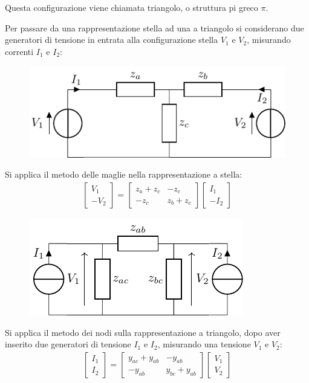 \documentclass{article}
\numberwithin{equation}{subsection}
\begin{document}
Questa configurazione viene chiamata triangolo, o struttura pi greco $\pi$.  

Per passare da una rappresentazione stella ad una a triangolo si considerano due generatori di tensione in entrata alla configurazione stella $V_1$ e $V_2$, misurando 
correnti $I_1$ e $I_2$:

\begin{figure}[ht]%
    \centering
    \includegraphics{rappresentazione-stella-entrate.pdf}
    \label{fig:rappresentazione-stella-entrate}
\end{figure}

Si applica il metodo delle maglie nella rappresentazione a stella:
\begin{gather*}
    \begin{bmatrix}
        V_1\\-V_2
    \end{bmatrix}=\begin{bmatrix}
        z_a+z_c&-z_c\\-z_c&z_b+z_c
    \end{bmatrix}\begin{bmatrix}
        I_1\\-I_2
    \end{bmatrix}
\end{gather*}
\begin{figure}[ht]%
    \centering
    \includegraphics{rappresentazione-triangolo-entrate.pdf}
    \label{fig:rappresentazione-triangolo-entrate}
\end{figure}


Si applica il metodo dei nodi sulla rappresentazione a triangolo, dopo aver inserito due generatori di tensione $I_1$ e $I_2$, misurando una 
tensione $V_1$ e $V_2$:
\begin{gather*}
    \begin{bmatrix}
        I_1\\I_2
    \end{bmatrix}=\begin{bmatrix}
        y_{ac}+y_{ab}&-y_{ab}\\-y_{ab}&y_{bc}+y_{ab}
    \end{bmatrix}\begin{bmatrix}
        V_1\\V_2
    \end{bmatrix}
\end{gather*}
\end{document}
